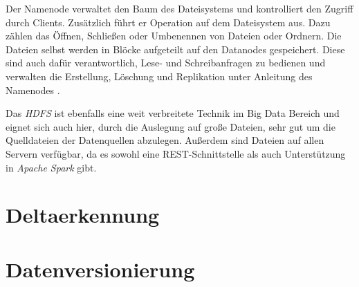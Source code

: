 Der Namenode verwaltet den Baum des Dateisystems und kontrolliert den Zugriff durch Clients.
Zusätzlich führt er Operation auf dem Dateisystem aus.
Dazu zählen das Öffnen, Schließen oder Umbenennen von Dateien oder Ordnern.
Die Dateien selbst werden in Blöcke aufgeteilt auf den Datanodes gespeichert.
Diese sind auch dafür verantwortlich, Lese- und Schreibanfragen zu bedienen und verwalten die Erstellung, Löschung und Replikation unter Anleitung des Namenodes \parencite{hdfs}.

Das \textit{HDFS} ist ebenfalls eine weit verbreitete Technik im Big Data Bereich und eignet sich auch hier, durch die Auslegung auf große Dateien, sehr gut um die Quelldateien der Datenquellen abzulegen.
Außerdem sind Dateien auf allen Servern verfügbar, da es sowohl eine REST-Schnittstelle als auch Unterstützung in \textit{Apache Spark} gibt.



\section{Deltaerkennung}

\section{Datenversionierung}